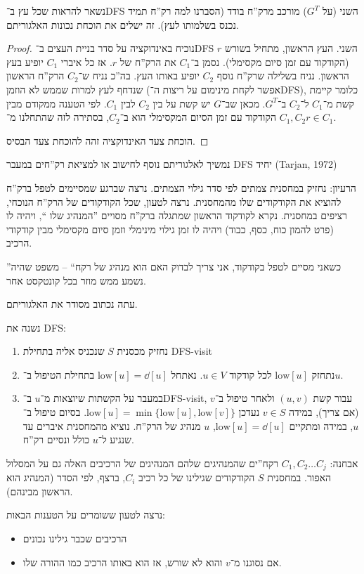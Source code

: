 \documentclass[]{../../../../tex/classes/styledArticle}
\newcommand\low{\mathrm{low}}
\begin{document}
	נשאר להראות שכל עץ ב־DFS השני (על $G^{T}$) מורכב מרק''ח בודד (הסברנו למה רק''ח תמיד נכנס בשלמותו לעץ). זה ישלים את הוכחת נכונות האלגוריתם. 
	\begin{proof}
		נוכיח באינדוקציה על סדר בניית העצים ב־DFS השני. העץ הראשון, מתחיל בשורש $r$ (הקודקוד עם זמן סיום מקסימלי). נסמן ב־$C_1$ את הרק''ח של $r$. אז כל איברי $C_1$ יופיע בעץ הראשון. נניח בשלילה שרק''ח נוסף $C_2$ יופיע באותו העץ. בה''כ נניח ש־$C_2$ הרק''ח הראשון שנדחף לעץ למרות שממש לא הוזמן (אפשר לקחת מינימום על ריצות ה־DFS), כלומר קיימת קשת מ־$C_1$ ל־$C_2$ ב־$G^{T}$. מכאן שב־$G$ יש קשת על בין $C_2$ לבין $C_1$. לפי הטענה ממקודם מבין $C_1, C_2$ הקודקוד עם זמן הסיום המקסימלי הוא ב־$C_2$, בסתירה לזה שהתחלנו מ־$r \in C_1$. 
		
		הוכחת צעד האינדוקציה זהה להוכחת צעד הבסיס. 
	\end{proof}
	
	
	נמשיך לאלגוריתם נוסף לחישוב או למציאת רק''חים במעבר DFS יחיד (Tarjan, 1972)
	
	הרעיון: נחזיק במחסנית צמתים לפי סדר גילוי הצמתים. נרצה שברגע שמסיימים לטפל ברק''ח להוציא את הקודקודים שלו מהמחסנית. נרצה לטעון, שכל הקודקודים של הרק''ח הנוכחי, רציפים במחסנית.  
נקרא לקודקוד הראשון שמתגלה ברק''ח מסויים ''המנהיג שלו	``, ויהיה לו (פרט להמון כוח, כסף, כבוד) ויהיה לו זמן גילוי מינימלי וזמן סיום מקסימלי מבין קודקודי הרכיב. 

	''כשאני מסיים לטפל בקודקוד, אני צריך לבדוק האם הוא מנהיג של רקח`` – משפט שהיה נשמע ממש מוזר בכל קונטקסט אחר. 
	
	עתה נכתוב מסודר את האלגוריתם.
	
	נשנה את DFS: 
	\begin{enumerate}
		\item נחזיק מכסנית $S$ שנכניס אליה בתחילת DFS-visit
		\item נתחזק $\low[u]$ לכל קודקוד $u \in V$. נאתחל $\low[u] = \dd[u]$ בתחילת הטיפול ב־$u$. 
		\item במעבר על הקשתות שיוצאות מ־$u$ ב־DFS-visit, עבור קשת $(u, v)$ ולאחר טיפול ב־$v$ (אם צריך), במידה $v \in S$ נעדכן $\low[u] = \min \{\low[u], \low[v]\}$. בסיום טיפול ב־$u$, במידה ומתקיים $\low[u] = \dd[u]$, $u$ מנהיג של הרק''ח. נוציא מהמחסנית איברים עד שנגיע ל־$u$ כולל ונסיים רק''ח. 
	\end{enumerate}
	
	אבחנה: $C_1, C_2 \dots C_j$ רקח''ים שהמנהיגים שלהם המנהיגים של הרכיבים האלה גם על המסלול האפור. במחסנית $S$ הקודקודים שגילינו של כל רכיב $C_i$, ברצף, לפי הסדר (המנהיג הוא הראשון מבינהם). 
	
	נרצה לטעון ששומרים על הטענות הבאות: 
	\begin{itemize}
		\item הרכיבים שכבר גילינו נכונים
		\item אם נסוגנו מ־$v$ והוא לא שורש, אז הוא באותו הרכיב כמו ההורה שלו. 
	\end{itemize}
	
\end{document}
